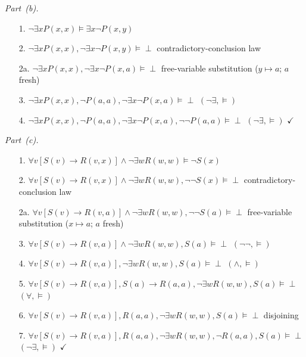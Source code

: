 \documentclass[11pt,letterpaper,oneside,openany]{book}
\begin{document}
\par\medskip\noindent\textit{Part~(b).}\par\nobreak
\begin{enumerate}[leftmargin=3.5em]
\item[1.] $\neg \exists x P(x,x) \vDash \exists x \neg P(x,y)$
\item[2.] $\neg \exists x P(x,x), \neg \exists x \neg P(x,y) \vDash \perp$ \quad contradictory-conclusion law
\item[2a.] $\neg \exists x P(x,x), \neg \exists x \neg P(x,a) \vDash \perp$ \quad free-variable substitution ($y\mapsto a$; $a$ fresh)
\item[3.] $\neg \exists x P(x,x), \neg P(a,a), \neg \exists x \neg P(x,a) \vDash \perp$ \quad $(\neg \exists, \vDash)$
\item[4.] $\neg \exists x P(x,x), \neg P(a,a), \neg \exists x \neg P(x,a), \neg \neg P(a,a) \vDash \perp$ \quad $(\neg \exists, \vDash)$ \quad $\checkmark$
\end{enumerate}

\par\medskip\noindent\textit{Part~(c).}\par\nobreak
\begin{enumerate}[leftmargin=3.5em]
\item[1.] $\forall v [S(v) \to R(v,x)] \land \neg \exists wR(w,w) \vDash \neg S(x)$
\item[2.] $\forall v [S(v) \to R(v,x)] \land \neg \exists wR(w,w), \neg\neg S(x) \vDash \perp$ \quad contradictory-conclusion law
\item[2a.] $\forall v [S(v) \to R(v,a)] \land \neg \exists wR(w,w), \neg\neg S(a) \vDash \perp$ \quad free-variable substitution ($x\mapsto a$; $a$ fresh)
\item[3.] $\forall v [S(v) \to R(v,a)] \land \neg \exists wR(w,w), S(a) \vDash \perp$ \quad $(\neg\neg, \vDash)$
\item[4.] $\forall v [S(v) \to R(v,a)], \neg \exists wR(w,w), S(a) \vDash \perp$ \quad $(\land, \vDash)$
\item[5.] $\forall v [S(v) \to R(v,a)], S(a) \to R(a,a), \neg \exists wR(w,w), S(a) \vDash \perp$ \quad $(\forall, \vDash)$
\item[6.] $\forall v [S(v) \to R(v,a)], R(a,a), \neg \exists wR(w,w), S(a) \vDash \perp$ \quad disjoining
\item[7.] $\forall v [S(v) \to R(v,a)], R(a,a), \neg \exists wR(w,w), \neg R(a,a), S(a) \vDash \perp$ \quad $(\neg \exists, \vDash)$ \quad $\checkmark$
\end{enumerate}
\end{document}

